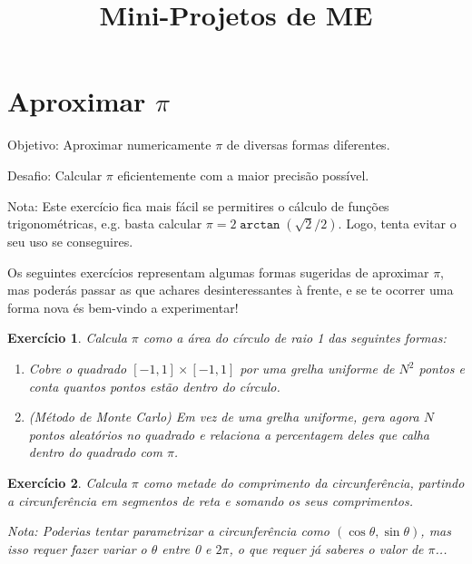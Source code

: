 \documentclass{article}
\title{Mini-Projetos de ME}
\author{}
\date{}
\newtheorem{ex}{Exercício}[section]
\begin{document}
\section{Aproximar $\pi$}

Objetivo: Aproximar numericamente $\pi$ de diversas formas diferentes.

Desafio: Calcular $\pi$ eficientemente com a maior precisão possível.

Nota: Este exercício fica mais fácil se permitires o cálculo de funções trigonométricas, e.g. basta calcular $\pi = 2 \mathop{\mathtt{arctan}}(\sqrt2 / 2)$. Logo, tenta evitar o seu uso se conseguires.

Os seguintes exercícios representam algumas formas sugeridas de aproximar $\pi$, mas poderás passar as que achares desinteressantes à frente, e se te ocorrer uma forma nova és bem-vindo a experimentar!

\begin{ex}
Calcula $\pi$ como a área do círculo de raio 1 das seguintes formas:
\begin{enumerate}
\item Cobre o quadrado $[-1,1]\times[-1,1]$ por uma grelha uniforme de $N^2$ pontos e conta quantos pontos estão dentro do círculo.

\item (Método de Monte Carlo) Em vez de uma grelha uniforme, gera agora $N$ pontos aleatórios no quadrado e relaciona a percentagem deles que calha dentro do quadrado com $\pi$.
\end{enumerate}
\end{ex}

\begin{ex}
Calcula $\pi$ como metade do comprimento da circunferência, partindo a circunferência em segmentos de reta e somando os seus comprimentos.

Nota: Poderias tentar parametrizar a circunferência como $(\cos\theta, \sin\theta)$, mas isso requer fazer variar o $\theta$ entre 0 e $2\pi$, o que requer já saberes o valor de $\pi$...
\end{ex}
\end{document}
